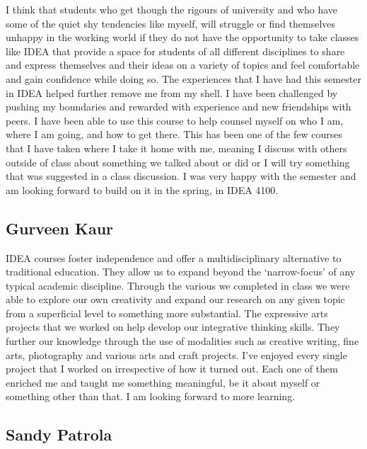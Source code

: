 \documentclass[letterpaper,10pt,headsepline]{scrreprt}
\begin{document}
I think that students who get though the rigours of university and who have some of the quiet shy tendencies like myself, will struggle or find themselves unhappy in the working world if they do not have the opportunity to take classes like IDEA that provide a space for students of all different disciplines to share and express themselves and their ideas on a variety of topics and feel comfortable and gain confidence while doing so. The experiences that I have had this semester in IDEA helped further remove me from my shell. I have been challenged by pushing my boundaries and rewarded with experience and new friendships with peers. I have been able to use this course to help counsel myself on who I am, where I am going, and how to get there. This has been one of the few courses that I have taken where I take it home with me, meaning I discuss with others outside of class about something we talked about or did or I will try something that was suggested in a class discussion. I was very happy with the semester and am looking forward to build on it in the spring, in IDEA 4100.

\subsection{Gurveen Kaur}

IDEA courses foster independence and offer a multidisciplinary alternative to traditional education. They allow us to expand beyond the ‘narrow-focus’ of any typical academic discipline. Through the various we completed in class we were able to explore our own creativity and expand our research on any given topic from a superficial level to something more substantial. The expressive arts projects that we worked on help develop our integrative thinking skills. They further our knowledge through the use of modalities such as creative writing, fine arts, photography and various arts and craft projects. I’ve enjoyed every single project that I worked on irrespective of how it turned out. Each one of them enriched me and taught me something meaningful, be it about myself or something other than that. I am looking forward to more learning.

\subsection{Sandy Patrola}
\end{document}
